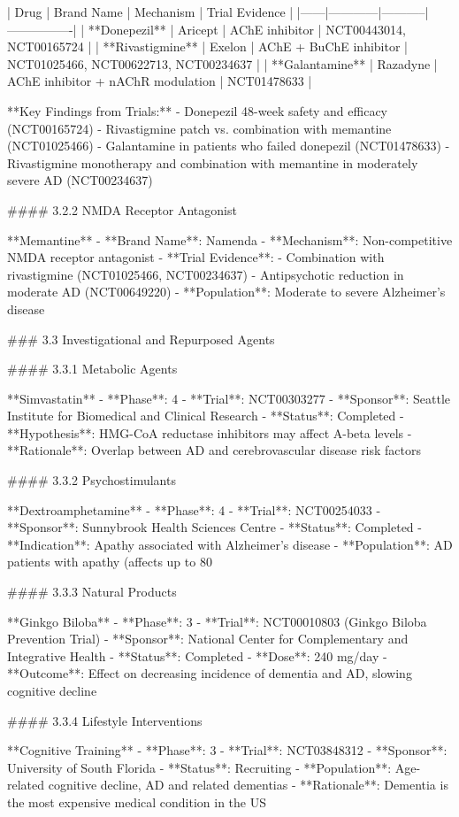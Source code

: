 | Drug | Brand Name | Mechanism | Trial Evidence |
|------|------------|-----------|----------------|
| **Donepezil** | Aricept | AChE inhibitor | NCT00443014, NCT00165724 |
| **Rivastigmine** | Exelon | AChE + BuChE inhibitor | NCT01025466, NCT00622713, NCT00234637 |
| **Galantamine** | Razadyne | AChE inhibitor + nAChR modulation | NCT01478633 |

**Key Findings from Trials:**
- Donepezil 48-week safety and efficacy (NCT00165724)
- Rivastigmine patch vs. combination with memantine (NCT01025466)
- Galantamine in patients who failed donepezil (NCT01478633)
- Rivastigmine monotherapy and combination with memantine in moderately severe AD (NCT00234637)

#### 3.2.2 NMDA Receptor Antagonist

**Memantine**
- **Brand Name**: Namenda
- **Mechanism**: Non-competitive NMDA receptor antagonist
- **Trial Evidence**: 
  - Combination with rivastigmine (NCT01025466, NCT00234637)
  - Antipsychotic reduction in moderate AD (NCT00649220)
- **Population**: Moderate to severe Alzheimer's disease

### 3.3 Investigational and Repurposed Agents

#### 3.3.1 Metabolic Agents

**Simvastatin**
- **Phase**: 4
- **Trial**: NCT00303277
- **Sponsor**: Seattle Institute for Biomedical and Clinical Research
- **Status**: Completed
- **Hypothesis**: HMG-CoA reductase inhibitors may affect A-beta levels
- **Rationale**: Overlap between AD and cerebrovascular disease risk factors

#### 3.3.2 Psychostimulants

**Dextroamphetamine**
- **Phase**: 4
- **Trial**: NCT00254033
- **Sponsor**: Sunnybrook Health Sciences Centre
- **Status**: Completed
- **Indication**: Apathy associated with Alzheimer's disease
- **Population**: AD patients with apathy (affects up to 80%

#### 3.3.3 Natural Products

**Ginkgo Biloba**
- **Phase**: 3
- **Trial**: NCT00010803 (Ginkgo Biloba Prevention Trial)
- **Sponsor**: National Center for Complementary and Integrative Health
- **Status**: Completed
- **Dose**: 240 mg/day
- **Outcome**: Effect on decreasing incidence of dementia and AD, slowing cognitive decline

#### 3.3.4 Lifestyle Interventions

**Cognitive Training**
- **Phase**: 3
- **Trial**: NCT03848312
- **Sponsor**: University of South Florida
- **Status**: Recruiting
- **Population**: Age-related cognitive decline, AD and related dementias
- **Rationale**: Dementia is the most expensive medical condition in the US

